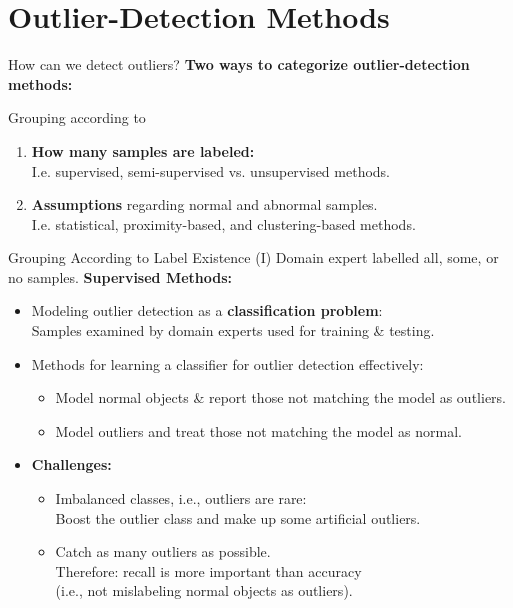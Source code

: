 \section{Outlier-Detection Methods}

\begin{frame}{How can we detect outliers?}
	\textbf{Two ways to categorize outlier-detection methods:}

	Grouping according to
	\begin{enumerate}
		\item \textcolor{faugray}{\textbf{How many samples are labeled:}}\\
		      I.e. supervised, semi-supervised vs. unsupervised methods.
		\item \textcolor{faugray}{\textbf{Assumptions}} regarding normal and abnormal samples.\\
		      I.e. statistical, proximity-based, and clustering-based methods.
	\end{enumerate}
\end{frame}


\begin{frame}{Grouping According to Label Existence (I)}
	Domain expert labelled all, some, or no samples.
	\vspace*{1em}
	\textcolor{faugray}{\textbf{Supervised Methods:}}
	\begin{itemize}
		\item Modeling outlier detection as a \textbf{classification problem}:\\
		      Samples examined by domain experts used for training \& testing.
		\item Methods for learning a classifier for outlier detection effectively:
		      \begin{itemize}
			      \item Model normal objects \& report those not matching the model as outliers.
			      \item Model outliers and treat those not matching the model as normal.
		      \end{itemize}
		\item \textbf{Challenges:}
		      \begin{itemize}
			      \item Imbalanced classes, i.e., outliers are rare: \\
			            Boost the outlier class and make up some artificial outliers.
			      \item Catch as many outliers as possible. \\
			            Therefore: recall is more important than accuracy \\
			            (i.e., not mislabeling normal objects as outliers).
		      \end{itemize}
	\end{itemize}
\end{frame}


